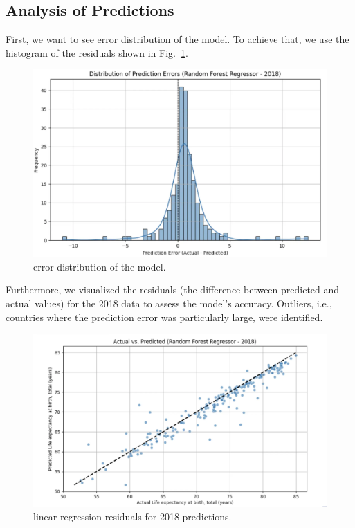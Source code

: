 \documentclass{article}
\begin{document}
\subsection{Analysis of Predictions}
\label{ssec:analysis_preds}

First, we want to see error distribution of the model. To achieve that, we use the histogram of the residuals
shown in Fig.~\ref{fig:correlation_heatmapc}.

\begin{figure}[h]
    \centering
    \includegraphics[width=0.8\columnwidth]{./pic/T1.c.1.png} %
    \caption{error distribution of the model.}
    \label{fig:correlation_heatmapc}
\end{figure}

Furthermore, we visualized the residuals (the difference between predicted and actual values) for the 2018 data 
to assess the model's accuracy. Outliers, i.e., countries where the prediction error was particularly 
large, were identified.
\begin{figure}[h]
    \centering
    \includegraphics[width=0.8\columnwidth]{./pic/T1.b.2.png} %
    \caption{linear regression residuals for 2018 predictions.}
    \label{fig:correlation_heatmap}
\end{figure}
\end{document}
